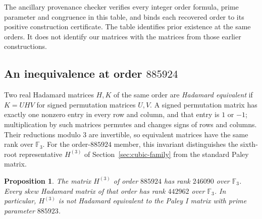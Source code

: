 \documentclass[10pt]{article}
\newtheorem{proposition}[theorem]{Proposition}
\newcommand{\F}{\mathbb F}
\begin{document}
The ancillary provenance checker verifies every integer order formula,
prime parameter and congruence in this table, and binds each recovered
order to its positive construction certificate. The table identifies
prior existence at the same orders. It does not identify our matrices
with the matrices from those earlier constructions.

\subsection{An inequivalence at order \texorpdfstring{$885924$}{885924}}

Two real Hadamard matrices $H,K$ of the same order are
\emph{Hadamard equivalent} if $K=UHV$ for signed permutation matrices
$U,V$. A signed permutation matrix has exactly one nonzero entry in
every row and column, and that entry is $1$ or $-1$; multiplication by
such matrices permutes and changes signs of rows and columns.
Their reductions modulo $3$ are invertible, so equivalent matrices
have the same rank over $\F_3$.
For the order-$885924$ member, this invariant distinguishes the
sixth-root representative $H^{(3)}$ of Section~\ref{sec:cubic-family}
from the standard Paley matrix.

\begin{proposition}\label{prop:inequivalent-paley}
The matrix $H^{(3)}$ of order $885924$ has rank $246090$ over $\F_3$.
Every skew Hadamard matrix of that order has rank $442962$ over $\F_3$.
In particular, $H^{(3)}$ is not Hadamard equivalent to the Paley I
matrix with prime parameter $885923$.
\end{proposition}
\end{document}
